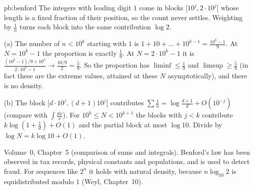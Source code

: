 \begin{solution}{pb:benford}
\idea The integers with leading digit $1$ come in blocks $[10^j,2\cdot10^j[$ whose length is a fixed fraction of their position,
so the count never settles. Weighting by $\frac1n$ turns each block into the same contribution $\log2$.

\writeup (a) The number of $n<10^k$ starting with $1$ is $1+10+\dots+10^{k-1}=\frac{10^k-1}9$. At $N=10^k-1$ the proportion is exactly
$\frac19$. At $N=2\cdot10^k-1$ it is $\frac{(10^k-1)/9+10^k}{2\cdot10^k-1}\to\frac{10/9}2=\frac59$. So the proportion has $\liminf\le\frac19$
and $\limsup\ge\frac59$ (in fact these are the extreme values, attained at these $N$ asymptotically), and there is no density.

(b) The block $[d\cdot10^j,(d+1)10^j[$ contributes $\sum\frac1n=\log\frac{d+1}d+O(10^{-j})$ (compare with $\int\frac{dx}x$). For
$10^k\le N<10^{k+1}$ the blocks with $j<k$ contribute $k\log(1+\frac1d)+O(1)$ and the partial block at most $\log10$. Divide by
$\log N=k\log10+O(1)$.

\tools Volume~0, Chapter~5 (comparison of sums and integrals).
\leads Benford's law has been observed in tax records, physical constants and populations, and is used to detect fraud. For sequences
like $2^n$ it holds with natural density, because $n\log_{10}2$ is equidistributed modulo $1$ (Weyl, Chapter~10).
\end{solution}

